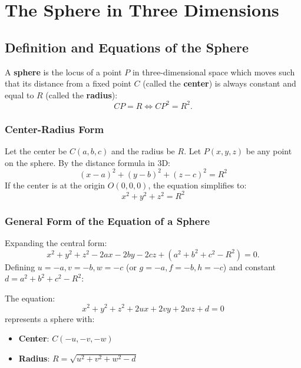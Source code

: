 \chapter{The Sphere in Three Dimensions}
\label{ch:the_sphere}

\section{Definition and Equations of the Sphere}

\begin{conceptbox}
A \textbf{sphere} is the locus of a point $P$ in three-dimensional space which moves such that its distance from a fixed point $C$ (called the \textbf{center}) is always constant and equal to $R$ (called the \textbf{radius}):
\begin{equation}
    CP = R \iff CP^2 = R^2.
\end{equation}
\end{conceptbox}

\subsection{Center-Radius Form}
Let the center be $C(a, b, c)$ and the radius be $R$. Let $P(x, y, z)$ be any point on the sphere.
By the distance formula in 3D:
\begin{equation}
    \boxed{(x - a)^2 + (y - b)^2 + (z - c)^2 = R^2}
\end{equation}
If the center is at the origin $O(0, 0, 0)$, the equation simplifies to:
\begin{equation}
    \boxed{x^2 + y^2 + z^2 = R^2}
\end{equation}

\subsection{General Form of the Equation of a Sphere}
Expanding the central form:
\begin{equation}
    x^2 + y^2 + z^2 - 2ax - 2by - 2cz + (a^2 + b^2 + c^2 - R^2) = 0.
\end{equation}
Defining $u = -a, v = -b, w = -c$ (or $g = -a, f = -b, h = -c$) and constant $d = a^2 + b^2 + c^2 - R^2$:

\begin{theorembox}
The equation:
\begin{equation}
    \boxed{x^2 + y^2 + z^2 + 2ux + 2vy + 2wz + d = 0}
\end{equation}
represents a sphere with:
\begin{itemize}[noitemsep]
    \item \textbf{Center}: $C(-u, -v, -w)$
    \item \textbf{Radius}: $R = \sqrt{u^2 + v^2 + w^2 - d}$
\end{itemize}
\end{theorembox}

